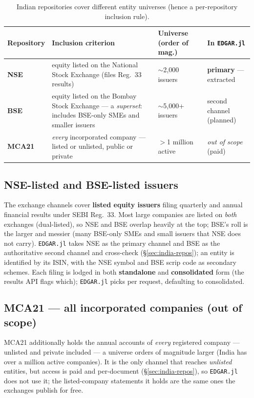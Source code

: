 \documentclass[11pt,a4paper]{report}
\begin{document}
\begin{table}[h]
\centering
\small
\caption{Indian repositories cover different entity universes (hence a per-repository inclusion rule).}
\label{tab:india-entities}
\begin{tabular}{@{}p{}p{}p{}p{}@{}}
\toprule
\textbf{Repository} & \textbf{Inclusion criterion} & \textbf{Universe (order of mag.)} & \textbf{In \texttt{EDGAR.jl}} \\
\midrule
\textbf{NSE} & equity listed on the National Stock Exchange (files Reg.~33 results) & $\sim$2{,}000 issuers & \textbf{primary} --- extracted \\
\textbf{BSE} & equity listed on the Bombay Stock Exchange --- a \emph{superset}: includes BSE-only SMEs and smaller issuers & $\sim$5{,}000+ issuers & second channel (planned) \\
\textbf{MCA21} & \emph{every} incorporated company --- listed or unlisted, public or private & $>$1 million active & \emph{out of scope} (paid) \\
\bottomrule
\end{tabular}
\end{table}

\subsection{NSE-listed and BSE-listed issuers}
The exchange channels cover \textbf{listed equity issuers} filing quarterly and annual financial results
under SEBI Reg.~33. Most large companies are listed on \emph{both} exchanges (dual-listed), so NSE and BSE
overlap heavily at the top; BSE's roll is the larger and messier (many BSE-only SMEs and small issuers that
NSE does not carry). \texttt{EDGAR.jl} takes NSE as the primary channel and BSE as the authoritative second
channel and cross-check (\S\ref{sec:india-repos}); an entity is identified by its ISIN, with the NSE symbol
and BSE scrip code as secondary schemes. Each filing is lodged in both \textbf{standalone} and
\textbf{consolidated} form (the results API flags which); \texttt{EDGAR.jl} picks per request, defaulting to
consolidated.

\subsection{MCA21 --- all incorporated companies (out of scope)}
MCA21 additionally holds the annual accounts of \emph{every} registered company --- unlisted and private
included --- a universe orders of magnitude larger (India has over a million active companies). It is the
only channel that reaches \emph{unlisted} entities, but access is paid and per-document
(\S\ref{sec:india-repos}), so \texttt{EDGAR.jl} does not use it; the listed-company statements it holds are
the same ones the exchanges publish for free.
\end{document}
